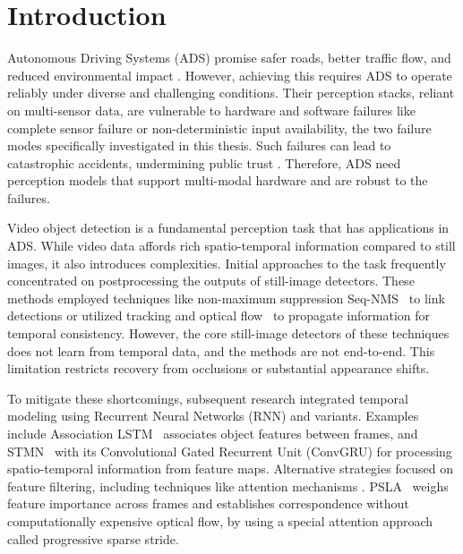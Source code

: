 \section{Introduction} \label{Introduction}


Autonomous Driving Systems (ADS) promise safer roads, better traffic flow, and reduced environmental impact \cite{litmanAutonomousVehicleImplementationb}. However, achieving this requires ADS to operate reliably under diverse and challenging conditions. Their perception stacks, reliant on multi-sensor data, are vulnerable to hardware and software failures like complete sensor failure or non-deterministic input availability, the two failure modes specifically investigated in this thesis. Such failures can lead to catastrophic accidents, undermining public trust \cite{yurtseverSurveyAutonomousDriving2020}. Therefore, ADS need perception models that support multi-modal hardware and are robust to the failures.

Video object detection is a fundamental perception task that has applications in ADS. While video data affords rich spatio-temporal information compared to still images, it also introduces complexities. Initial approaches to the task frequently concentrated on postprocessing the outputs of still-image detectors. These methods employed techniques like non-maximum suppression Seq-NMS~\cite{hanSeqNMSVideoObject2016} to link detections or utilized tracking and optical flow~\cite{kangObjectDetectionVideo2016, kangTCNNTubeletsConvolutional2018} to propagate information for temporal consistency. However, the core still-image detectors of these techniques does not learn from temporal data, and the methods are not end-to-end. This limitation restricts recovery from occlusions or substantial appearance shifts.

To mitigate these shortcomings, subsequent research integrated temporal modeling using Recurrent Neural Networks (RNN) and variants. Examples include Association LSTM~\cite{Lu_2017_ICCV} associates object features between frames, and STMN~\cite{xiaoVideoObjectDetection2018} with its Convolutional Gated Recurrent Unit (ConvGRU) for processing spatio-temporal information from feature maps. Alternative strategies focused on feature filtering, including techniques like attention mechanisms \cite{bahdanauNeuralMachineTranslation2016a}. PSLA~\cite{guoProgressiveSparseLocal2019} weighs feature importance across frames and establishes correspondence without computationally expensive optical flow, by using a special attention approach called progressive sparse stride.

